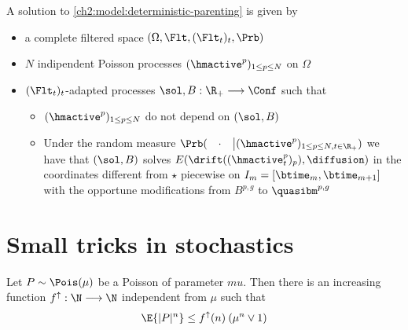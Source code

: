 \begin{definition}
A solution to \ref{ch2:model:deterministic-parenting} is given by
\begin{itemize}
\item a complete filtered space $(\Omega, \Flt, (\Flt_t)_t, \Prb)$
\item $N$ indipendent Poisson processes $(\hmactive^p)_{1\leq p\leq N}$ on $\Omega$
\item $(\Flt_t)_t$-adapted processes $\sol,B:\R_+ \longrightarrow \Conf$ such that 
	\begin{itemize}
	\item $(\hmactive^p)_{1\leq p\leq N}$ do not depend on $(\sol,B)$
	\item Under the random measure $\Prb(\quad\cdot\quad \big| (\hmactive^p)_{1\leq p\leq N, t\in\R_+})$ we have that $(\sol,B)$ solves $E(\drift((\hmactive_t^p)_p), \diffusion)$ in the coordinates different from $\star$ piecewise on $I_m=[\btime_m,\btime_{m+1}]$ with the opportune modifications from $B^{p,g}$ to $\quasibm^{p,g}$
	\end{itemize}
\end{itemize}
\end{definition}


\section{Small tricks in stochastics}

\begin{lemma}
	\label{app:Poisson-moments}
	Let $P \sim \Pois(\mu)$ be a Poisson \rv of parameter $mu$.
	Then there is an increasing function $f^{\uparrow}: \N \longrightarrow \N$ independent from $\mu$ such that 
	\begin{equation*}
		\E{|P|^n} \leq  f^{\uparrow}(n)\: (\mu^n \vee 1)
	\end{equation*}
\end{lemma}


